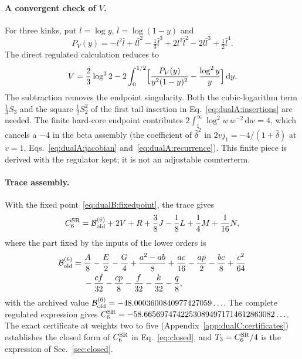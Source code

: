 \documentclass[11pt,a4paper]{article}
\numberwithin{equation}{section}
\newcommand{\dd}{\,\mathrm d}
\newcommand{\CSR}{C^{\rm SR}}
\newcommand{\db}{\bar\delta}
\begin{document}
\paragraph{A convergent check of $V$.} For three kinks, put $l=\log y$, $\bar l=\log(1-y)$ and
\begin{equation}
 P_V(y)=-l^2\bar l+l\bar l^2-\tfrac13\bar l^3+2l^2\bar l^2-2l\bar l^3+\tfrac12\bar l^4.
\end{equation}
The direct regulated calculation reduces to
\begin{equation}
 V=\frac23\log^32-2\int_0^{1/2}\Bigl[\frac{P_V(y)}{y^2(1-y)^2}-\frac{\log^2y}{y}\Bigr]\dd y.
 \label{eq:dualB:Vintegral}
\end{equation}
The subtraction removes the endpoint singularity. Both the cubic-logarithm term $\frac13S_3$ and the square
$\frac12S_2^2$ of the first tail insertion in Eq.~\eqref{eq:dualA:insertions} are needed. The finite hard-core
endpoint contributes $2\int_1^\infty\log^2w\,w^{-2}\dd w=4$, which cancels a $-4$ in the beta assembly (the coefficient
of $\db^2$ in $2vj_1=-4/(1+\db)$ at $v=1$, Eqs.~\eqref{eq:dualA:jacobian} and~\eqref{eq:dualA:recurrence}). This
finite piece is derived with the regulator kept; it is not an adjustable counterterm.

\paragraph{Trace assembly.} With the fixed point~\eqref{eq:dualB:fixedpoint}, the trace gives
\begin{equation}
 \CSR_6=\mathcal B^{(6)}_{\rm old}+2V+R+\frac38J-\frac18L+\frac14M+\frac1{16}N,
 \label{eq:dualB:C6assembly}
\end{equation}
where the part fixed by the inputs of the lower orders is
\begin{equation}
\begin{aligned}
 \mathcal B^{(6)}_{\rm old}={}&\frac A8-\frac E2-\frac G4+\frac{a^2-ab}{8}+\frac{ac}{16}-\frac{ap}{2}-\frac{bc}{8}
 +\frac{c^2}{64}\\
 &-\frac{cf}{32}-\frac{cp}{8}-\frac f{32}-\frac k{32}-\frac q8,
\end{aligned}
\end{equation}
with the archived value $\mathcal B^{(6)}_{\rm old}=-48.0003600840977427059\ldots$. The complete regulated expression
gives $\CSR_6=-58.66569747422530894971714612863082\ldots$. The exact certificate at weights two to five (Appendix~\ref{app:dualC:certificates}) establishes the closed form of $\CSR_6$ in Eq.~\eqref{eq:closed}, and $T_3=\CSR_6/4$ is the
expression of Sec.~\ref{sec:closed}.
\end{document}
